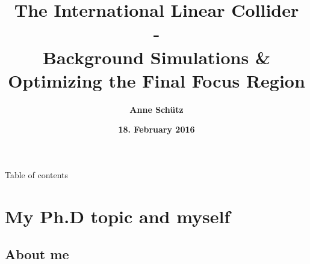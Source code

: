 \documentclass[xcolor={dvipsnames}]{beamer}
\title[ILC \& Background Simulations]{\textbf{\LARGE The International Linear Collider \\ \normalsize- \\ \small Background Simulations \& Optimizing the Final Focus Region}}
\author{\textbf{Anne Sch\"utz}}
\institute{\textbf{KIT, DESY}}
\date{\textbf{18. February 2016}}
\begin{document}
{
\begin{frame}
  \titlepage
\end{frame}
}

\begin{frame}{Table of contents}
  \tableofcontents
\end{frame}

\section{My Ph.D topic and myself}
\subsection{About me}
\end{document}
